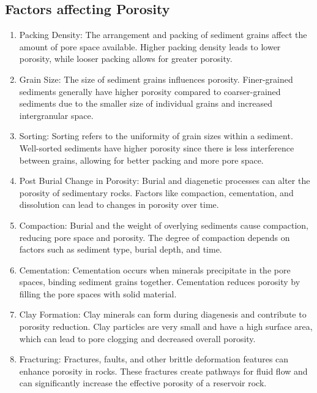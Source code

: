 \documentclass{article}
\begin{document}
  \subsection*{Factors affecting Porosity}
  \begin{enumerate}
    \item Packing Density: The arrangement and packing of sediment grains affect the amount of pore space available. Higher packing density leads to lower porosity, while looser packing allows for greater porosity.
    \item Grain Size: The size of sediment grains influences porosity. Finer-grained sediments generally have higher porosity compared to coarser-grained sediments due to the smaller size of individual grains and increased intergranular space.
    \item Sorting: Sorting refers to the uniformity of grain sizes within a sediment. Well-sorted sediments have higher porosity since there is less interference between grains, allowing for better packing and more pore space.
    \item Post Burial Change in Porosity: Burial and diagenetic processes can alter the porosity of sedimentary rocks. Factors like compaction, cementation, and dissolution can lead to changes in porosity over time.
    \item Compaction: Burial and the weight of overlying sediments cause compaction, reducing pore space and porosity. The degree of compaction depends on factors such as sediment type, burial depth, and time.
    \item Cementation: Cementation occurs when minerals precipitate in the pore spaces, binding sediment grains together. Cementation reduces porosity by filling the pore spaces with solid material.
    \item Clay Formation: Clay minerals can form during diagenesis and contribute to porosity reduction. Clay particles are very small and have a high surface area, which can lead to pore clogging and decreased overall porosity.
    \item Fracturing: Fractures, faults, and other brittle deformation features can enhance porosity in rocks. These fractures create pathways for fluid flow and can significantly increase the effective porosity of a reservoir rock.
  \end{enumerate}
  
\end{document}
